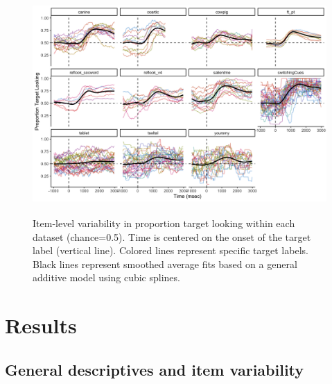 \documentclass[10pt, letterpaper]{article}
\begin{document}
\begin{figure} 
\includegraphics[width=14cm,height=8.4cm]{../figures/peekbank_item_vis.png}
\caption{Item-level variability in proportion target looking within each dataset (chance=0.5). Time is centered on the onset of the target label (vertical line). Colored lines represent specific target labels. Black lines represent smoothed average fits based on a general additive model using cubic splines.}
\label{fig:peekbank_item_vis}
\end{figure}

\hypertarget{results}{%
\section{Results}\label{results}}

\hypertarget{general-descriptives-and-item-variability}{%
\subsection{General descriptives and item
variability}\label{general-descriptives-and-item-variability}}
\end{document}

